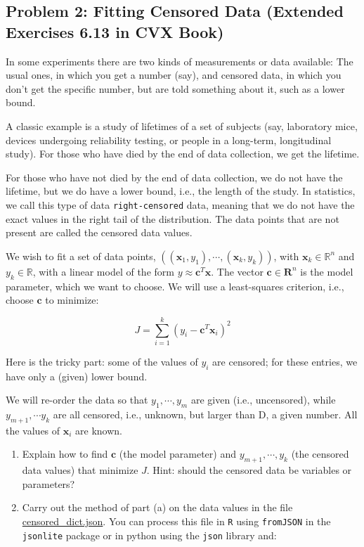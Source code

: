 \documentclass[
  letterpaper,
  DIV=11,
  numbers=noendperiod]{scrartcl}
\begin{document}
\subsection{Problem 2: Fitting Censored Data (Extended Exercises 6.13 in
CVX
Book)}\label{problem-2-fitting-censored-data-extended-exercises-6.13-in-cvx-book}

In some experiments there are two kinds of measurements or data
available: The usual ones, in which you get a number (say), and censored
data, in which you don't get the specific number, but are told something
about it, such as a lower bound.

A classic example is a study of lifetimes of a set of subjects (say,
laboratory mice, devices undergoing reliability testing, or people in a
long-term, longitudinal study). For those who have died by the end of
data collection, we get the lifetime.

For those who have not died by the end of data collection, we do not
have the lifetime, but we do have a lower bound, i.e., the length of the
study. In statistics, we call this type of data \texttt{right-censored}
data, meaning that we do not have the exact values in the right tail of
the distribution. The data points that are not present are called the
censored data values.

We wish to fit a set of data points,
\(\left((\mathbf{x}_1,y_1), \cdots, (\mathbf{x}_k,y_k)\right)\), with
\(\mathbf{x}_k \in \mathbb{R}^n\) and \(y_k\in\mathbb{R}\), with a
linear model of the form \(y ≈ \mathbf{c}^T \mathbf{x}\). The vector
\(\mathbf{c} \in \mathbf{R}^n\) is the model parameter, which we want to
choose. We will use a least-squares criterion, i.e., choose
\(\mathbf{c}\) to minimize:

\[
J = \sum_{i=1}^k \left(y_i - \mathbf{c}^T\mathbf{x}_i\right)^2
\]

Here is the tricky part: some of the values of \(y_i\) are censored; for
these entries, we have only a (given) lower bound.

We will re-order the data so that \(y_1 , \cdots , y_m\) are given
(i.e., uncensored), while \(y_{m+1} , \cdots y_k\) are all censored,
i.e., unknown, but larger than D, a given number. All the values of
\(\mathbf{x}_i\) are known.

\begin{enumerate}
\def\labelenumi{(\alph{enumi})}
\item
  Explain how to find \(\mathbf{c}\) (the model parameter) and
  \(y_{m+1} ,\cdots , y_k\) (the censored data values) that minimize
  \(J\). Hint: should the censored data be variables or parameters?
\item
  Carry out the method of part (a) on the data values in the file
  \href{https://github.com/georgehagstrom/DATA609Spring2025/blob/main/website/assignments/labs/labData/censored_dict.json}{censored\_dict.json}.
  You can process this file in \texttt{R} using \texttt{fromJSON} in the
  \texttt{jsonlite} package or in python using the \texttt{json} library
  and:
\end{enumerate}
\end{document}
